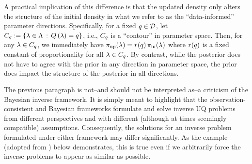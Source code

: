 A practical implication of this difference is that the updated density only alters the structure of the initial density in what we refer to as the ``data-informed'' parameter directions.
Specifically, for a fixed $q\in\mathcal{D}$, let $C_q := \left\{\lambda\in{\Lambda}\, : \, Q\left ( \lambda \right )=q\right\}$, i.e., $C_q$ is a ``contour'' in parameter space.
Then, for any $\lambda\in C_q$, we immediately have $\operatorname*{\pi_{up}}(\lambda)=r(q)\operatorname*{\pi_{in}}(\lambda)$ where $r(q)$ is a fixed constant of proportionality for all $\lambda\in C_q$.
By contrast, while the posterior does not have to agree with the prior in any direction in parameter space, the prior does impact the structure of the posterior in all directions.

The previous paragraph is not\---and should not be interpreted as\---a criticism of the Bayesian inverse framework.
It is simply meant to highlight that the observation-consistent and Bayesian frameworks formulate and solve inverse UQ problems from different perspectives and with different (although at times seemingly compatible) assumptions.
Consequently, the solutions for an inverse problem formulated under either framework may differ significantly.
As the example (adopted from \cite{BJW18}) below demonstrates, this is true even if we arbitrarily force the inverse problems to appear as similar as possible.
\vfill
